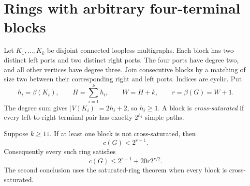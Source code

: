 \section{Rings with arbitrary four-terminal blocks}
\label{sec:general-four-pole-rings}

Let $K_1,\ldots,K_k$ be disjoint connected loopless multigraphs.
Each block has two distinct left ports and two distinct right ports.
The four ports have degree two, and all other vertices have degree three.
Join consecutive blocks by a matching of size two between their corresponding
right and left ports. Indices are cyclic. Put
\[
 h_i=\beta(K_i),\qquad H=\sum_{i=1}^k h_i,\qquad
 W=H+k,\qquad r=\beta(G)=W+1.
\]
The degree sum gives $|V(K_i)|=2h_i+2$, so $h_i\ge1$.
A block is \emph{cross-saturated} if every left-to-right terminal pair has
exactly $2^{h_i}$ simple paths.

\begin{proposition}
\label{prop:general-four-pole-ring}
Suppose $k\ge11$. If at least one block is not cross-saturated, then
\[
 c(G)<2^{r-1}.
\]
Consequently every such ring satisfies
\[
 c(G)\le 2^{r-1}+20r2^{r/2}.
\]
The second conclusion uses the saturated-ring theorem when every block is
cross-saturated.
\end{proposition}

